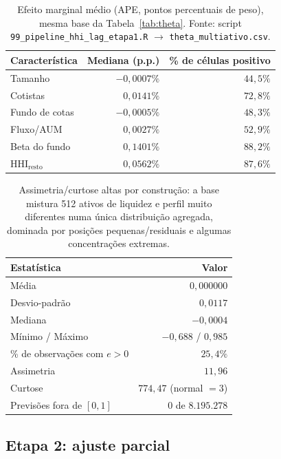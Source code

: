 \documentclass[11pt,a4paper]{article}
\begin{document}
\begin{table}[h]\centering\small
\caption{Efeito marginal médio (APE, pontos percentuais de peso), mesma base da Tabela~\ref{tab:theta}.
Fonte: script \texttt{99\_pipeline\_hhi\_lag\_etapa1.R} $\to$ \texttt{theta\_multiativo.csv}.}
\label{tab:ape}
\begin{tabular}{@{}lrr@{}}
\toprule
Característica & Mediana (p.p.) & \% de células positivo \\
\midrule
Tamanho & $-0{,}0007\%$ & $44{,}5\%$ \\
Cotistas & $0{,}0141\%$ & $72{,}8\%$ \\
Fundo de cotas & $-0{,}0005\%$ & $48{,}3\%$ \\
Fluxo/AUM & $0{,}0027\%$ & $52{,}9\%$ \\
Beta do fundo & $0{,}1401\%$ & $88{,}2\%$ \\
$\text{HHI}_{\text{resto}}$ & $0{,}0562\%$ & $87{,}6\%$ \\
\bottomrule
\end{tabular}
\end{table}

\begin{table}[h]\centering\small
\caption{Estatísticas do erro $e$, Etapa 1, 8.195.278 observações. Fonte: script
\texttt{99\_pipeline\_hhi\_lag\_etapa1.R} $\to$ \texttt{erro\_e\_multiativo.csv}.}
\label{tab:erro-e}
\begin{tabular}{@{}lr@{}}
\toprule
Estatística & Valor \\
\midrule
Média & $0{,}000000$ \\
Desvio-padrão & $0{,}0117$ \\
Mediana & $-0{,}0004$ \\
Mínimo / Máximo & $-0{,}688$ / $0{,}985$ \\
\% de observações com $e>0$ & $25{,}4\%$ \\
Assimetria & $11{,}96$ \\
Curtose & $774{,}47$ (normal $=3$) \\
Previsões fora de $[0,1]$ & $0$ de $8.195.278$ \\
\bottomrule
\end{tabular}
\caption*{\footnotesize Assimetria/curtose altas por construção: a base mistura 512 ativos de
liquidez e perfil muito diferentes numa única distribuição agregada, dominada por posições
pequenas/residuais e algumas concentrações extremas.}
\end{table}

\FloatBarrier
\subsection{Etapa 2: ajuste parcial}
\end{document}

